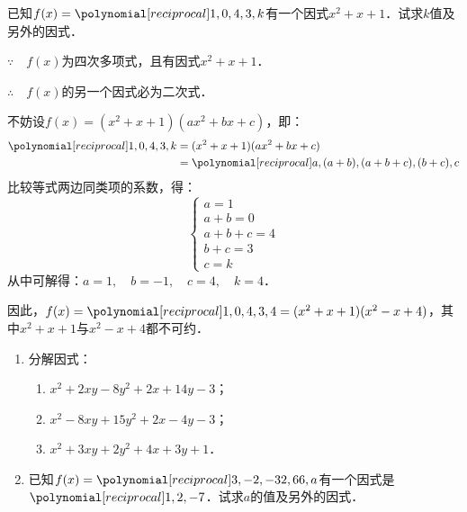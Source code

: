 \begin{example}
    已知$f(x)=\poly{1,0,4,3,k}$有一个因式$x^2+x+1$．试求$k$值及另外的因式．
\end{example}

\begin{solution}
    $\because\quad f(x)$为四次多项式，且有因式$x^2+x+1$．

    $\therefore\quad f(x)$的另一个因式必为二次式．

    不妨设$f(x)=(x^2+x+1)(ax^2+bx+c)$，即：
\[\begin{split}
    \poly{1,0,4,3,k}&=(x^2+x+1)(ax^2+bx+c)\\
    &=\poly{a,(a+b),(a+b+c),(b+c),c}
\end{split}\]
比较等式两边同类项的系数，得：
\[\begin{cases}
    a=1\\
    a+b=0\\
    a+b+c=4\\
    b+c=3\\
    c=k
\end{cases}\]
从中可解得：$a=1,\quad b=-1,\quad c=4,\quad k=4$．

因此，$f(x)=\poly{1,0,4,3,4}=(x^2+x+1)(x^2-x+4)$，其中$x^2+x+1$与$x^2-x+4$都不可约．
\end{solution}

\begin{ex}
\begin{enumerate}
    \item 分解因式：
\begin{enumerate}
    \item $x^2+2xy-8y^2+2x+14y-3$；
    \item $x^2-8xy+15y^2+2x-4y-3$；
    \item $x^2+3xy+2y^2+4x+3y+1$．
\end{enumerate}
\item  已知$f(x)=\poly{3,-2,-32,66,a}$有一个因式是$\poly{1,2,-7}$．试求$a$的值及另外的因式．
\end{enumerate}    
\end{ex}


